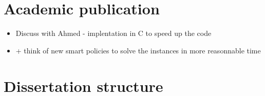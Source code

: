 \section{Academic publication}
\begin{itemize}
    \item Discuss with Ahmed - implentation in C to speed up the code
    \item + think of new smart policies to solve the instances in more reasonnable time
\end{itemize}

\section{Dissertation structure}